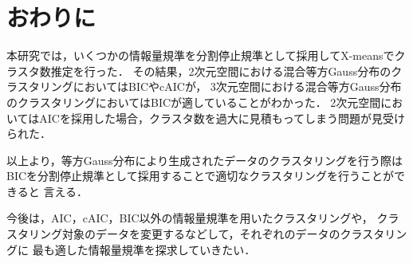 \section{おわりに}

本研究では，いくつかの情報量規準を分割停止規準として採用してX-meansでクラスタ数推定を行った．
その結果，2次元空間における混合等方Gauss分布のクラスタリングにおいてはBICやcAICが，
3次元空間における混合等方Gauss分布のクラスタリングにおいてはBICが適していることがわかった．
2次元空間においてはAICを採用した場合，クラスタ数を過大に見積もってしまう問題が見受けられた．

以上より，等方Gauss分布により生成されたデータのクラスタリングを行う際は
BICを分割停止規準として採用することで適切なクラスタリングを行うことができると
言える．

今後は，AIC，cAIC，BIC以外の情報量規準を用いたクラスタリングや，
クラスタリング対象のデータを変更するなどして，それぞれのデータのクラスタリングに
最も適した情報量規準を探求していきたい．

